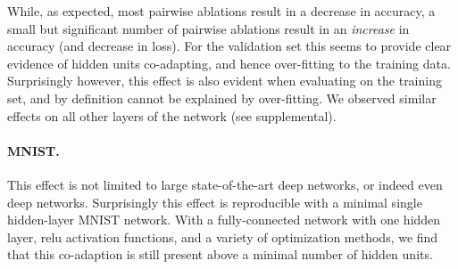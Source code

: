 \documentclass[thesis]{subfiles}
\begin{document}
While, as expected, most pairwise ablations result in a decrease in accuracy, a small but significant number of pairwise ablations result in an \emph{increase} in accuracy (and decrease in loss). For the validation set this seems to provide clear evidence of hidden units co-adapting, and hence over-fitting to the training data. Surprisingly however, this effect is also evident when evaluating on the training set, and by definition cannot be explained by over-fitting. We observed similar effects on all other layers of the network (see supplemental).


\paragraph{MNIST.} This effect is not limited to large state-of-the-art deep networks, or indeed even deep networks. Surprisingly this effect is reproducible with a minimal single hidden-layer MNIST network. With a fully-connected network with one hidden layer, \gls{relu} activation functions, and a variety of optimization methods, we find that this co-adaption is still present above a minimal number of hidden units.  
\end{document}

